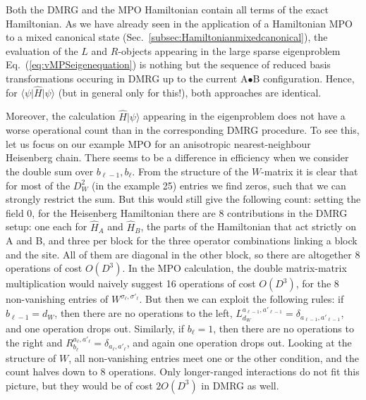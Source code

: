 \documentclass[a4paper,10pt,oneside,onecolumn,1p,times]{elsarticle}
\newcommand{\bra}[1]{\mbox{$\langle #1  |$}}
\newcommand{\ket}[1]{\mbox{$| #1  \rangle$}}
\begin{document}
Both the DMRG and the MPO Hamiltonian contain all terms of the exact Hamiltonian. As we have already seen in the application of a Hamiltonian MPO to a mixed canonical state (Sec.~\ref{subsec:Hamiltonianmixedcanonical}), the evaluation of the $L$ and $R$-objects appearing in the large sparse eigenproblem Eq.~(\ref{eq:vMPSeigenequation}) is nothing but the sequence of reduced basis transformations occuring in DMRG up to the current A$\bullet$B configuration. Hence, for $\bra{\psi} \hat{H} \ket{\psi}$ (but in general only for this!), both approaches are identical.

Moreover, the calculation $\hat{H}\ket{\psi}$ appearing in the eigenproblem does not have a worse operational count than in the corresponding DMRG procedure. To see this, let us focus on our example MPO for an anisotropic nearest-neighbour Heisenberg chain. There seems to be a difference in efficiency when we consider the double sum over $b_{\ell-1}, b_{\ell}$. From the structure of the $W$-matrix it is clear that for most of the $D_W^2$ (in the example 25) entries we find zeros, such that we can strongly restrict the sum. But this would still give the following count: setting the field 0, for the Heisenberg Hamiltonian there are 8 contributions in the DMRG setup: one each for $\hat{H}_A$ and $\hat{H}_B$, the parts of the Hamiltonian that act strictly on A and B, and three per block for the three operator combinations linking a block and the site. All of them are diagonal in the other block, so there are altogether 8 operations of cost $O(D^3)$. In the MPO calculation, the double matrix-matrix multiplication would naively suggest 16 operations of cost $O(D^3)$, for the 8 non-vanishing entries of $W^{\sigma_{\ell},\sigma'_{\ell}}$. But then we can exploit the following rules: if $b_{\ell-1}=d_W$, then there are no operations to the left, $L^{a_{\ell-1}, a'_{\ell-1}}_{d_W}= \delta_{a_{\ell-1}, a'_{\ell-1}}$, and one operation drops out. Similarly, if $b_{\ell}=1$, then there are no operations to the right and $R^{a_{\ell},a'_{\ell}}_{b_{\ell}}=\delta_{a_{\ell},a'_{\ell}}$, and again one operation drops out. Looking at the structure of $W$, all non-vanishing entries meet one or the other condition, and the count halves down to 8 operations. Only longer-ranged interactions do not fit this picture, but they would be of cost $2O(D^3)$ in DMRG as well.
\end{document}
